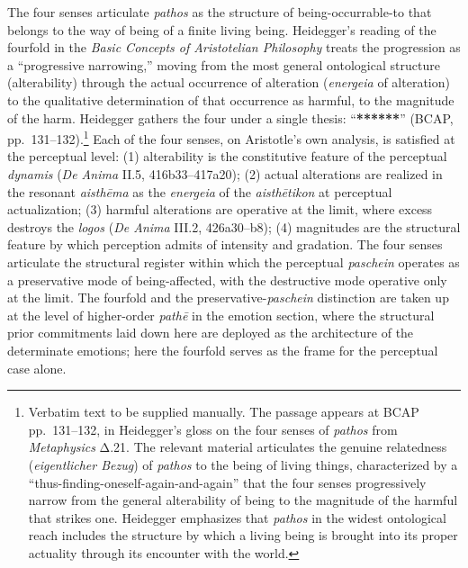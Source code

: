 The four senses articulate \textit{pathos} as the structure of being-occurrable-to that belongs to the way of being of a finite living being. Heidegger's reading of the fourfold in the \textit{Basic Concepts of Aristotelian Philosophy} treats the progression as a ``progressive narrowing,'' moving from the most general ontological structure (alterability) through the actual occurrence of alteration (\textit{energeia} of alteration) to the qualitative determination of that occurrence as harmful, to the magnitude of the harm. Heidegger gathers the four under a single thesis: ``\textbf{******}'' (BCAP, pp.~131--132).\footnote{Verbatim text to be supplied manually. The passage appears at BCAP pp.~131--132, in Heidegger's gloss on the four senses of \textit{pathos} from \textit{Metaphysics} Δ.21. The relevant material articulates the genuine relatedness (\textit{eigentlicher Bezug}) of \textit{pathos} to the being of living things, characterized by a ``thus-finding-oneself-again-and-again'' that the four senses progressively narrow from the general alterability of being to the magnitude of the harmful that strikes one. Heidegger emphasizes that \textit{pathos} in the widest ontological reach includes the structure by which a living being is brought into its proper actuality through its encounter with the world.} Each of the four senses, on Aristotle's own analysis, is satisfied at the perceptual level: (1) alterability is the constitutive feature of the perceptual \textit{dynamis} (\textit{De Anima} II.5, 416b33--417a20); (2) actual alterations are realized in the resonant \textit{aisthēma} as the \textit{energeia} of the \textit{aisthētikon} at perceptual actualization; (3) harmful alterations are operative at the limit, where excess destroys the \textit{logos} (\textit{De Anima} III.2, 426a30--b8); (4) magnitudes are the structural feature by which perception admits of intensity and gradation. The four senses articulate the structural register within which the perceptual \textit{paschein} operates as a preservative mode of being-affected, with the destructive mode operative only at the limit. The fourfold and the preservative-\textit{paschein} distinction are taken up at the level of higher-order \textit{pathē} in the emotion section, where the structural prior commitments laid down here are deployed as the architecture of the determinate emotions; here the fourfold serves as the frame for the perceptual case alone.

